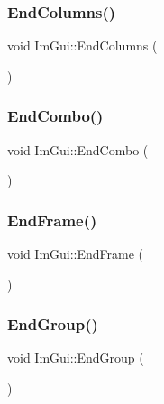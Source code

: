 \hypertarget{namespace_im_gui_af93bed3bce5475fe4d525d744f16aa20}{}\label{namespace_im_gui_af93bed3bce5475fe4d525d744f16aa20} 
\subsubsection{\texorpdfstring{End\+Columns()}{EndColumns()}}
{\footnotesize\ttfamily void Im\+Gui\+::\+End\+Columns (\begin{DoxyParamCaption}{ }\end{DoxyParamCaption})}

\hypertarget{namespace_im_gui_a63434692d7de278875c7ea0143fbe6e4}{}\label{namespace_im_gui_a63434692d7de278875c7ea0143fbe6e4} 
\subsubsection{\texorpdfstring{End\+Combo()}{EndCombo()}}
{\footnotesize\ttfamily void Im\+Gui\+::\+End\+Combo (\begin{DoxyParamCaption}{ }\end{DoxyParamCaption})}

\hypertarget{namespace_im_gui_a246c37da45e88a12ade440a0feacb4ee}{}\label{namespace_im_gui_a246c37da45e88a12ade440a0feacb4ee} 
\subsubsection{\texorpdfstring{End\+Frame()}{EndFrame()}}
{\footnotesize\ttfamily void Im\+Gui\+::\+End\+Frame (\begin{DoxyParamCaption}{ }\end{DoxyParamCaption})}

\hypertarget{namespace_im_gui_a05fc97fc64f28a55486087f503d9a622}{}\label{namespace_im_gui_a05fc97fc64f28a55486087f503d9a622} 
\subsubsection{\texorpdfstring{End\+Group()}{EndGroup()}}
{\footnotesize\ttfamily void Im\+Gui\+::\+End\+Group (\begin{DoxyParamCaption}{ }\end{DoxyParamCaption})}

